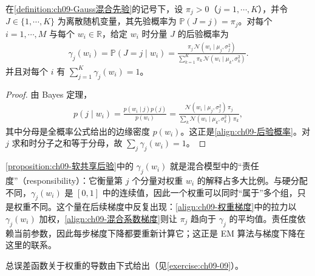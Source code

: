 \documentclass[../../main.tex]{subfiles}
\begin{document}
\begin{proposition}[软权重共享的后验概率]\label{proposition:ch09-软共享后验}
在\cref{definition:ch09-Gauss混合先验}的记号下，设 $\pi_{j}>0$（$j=1,\cdots,K$），并令 $J\in\{1,\cdots,K\}$ 为离散随机变量，其先验概率为 $\mathbb{P}(J=j)=\pi_{j}$。对每个 $i=1,\cdots,M$ 与每个 $w_{i}\in\mathbb{R}$，给定 $w_{i}$ 时分量 $J$ 的后验概率为
\begin{align}
\gamma_{j}(w_{i})=\mathbb{P}(J=j\mid w_{i})=\frac{\pi_{j}\,\mathcal{N}\!\left(w_{i}\mid\mu_{j},\sigma_{j}^{2}\right)}{\sum_{k=1}^{K}\pi_{k}\,\mathcal{N}\!\left(w_{i}\mid\mu_{k},\sigma_{k}^{2}\right)}.
\label{align:ch09-后验概率}
\end{align}
并且对每个 $i$ 有 $\sum_{j=1}^{K}\gamma_{j}(w_{i})=1$。
\end{proposition}

\begin{proof}
由 Bayes 定理，
\begin{align*}
p(j\mid w_{i})=\frac{p(w_{i}\mid j)p(j)}{p(w_{i})}=\frac{\mathcal{N}(w_{i}\mid\mu_{j},\sigma_{j}^{2})\,\pi_{j}}{\sum_{k}\mathcal{N}(w_{i}\mid\mu_{k},\sigma_{k}^{2})\,\pi_{k}},
\end{align*}
其中分母是全概率公式给出的边缘密度 $p(w_{i})$。这正是\eqref{align:ch09-后验概率}。对 $j$ 求和时分子之和等于分母，故 $\sum_{j}\gamma_{j}(w_{i})=1$。
\end{proof}

\begin{remark}\cref{proposition:ch09-软共享后验}中的 $\gamma_{j}(w_{i})$ 就是混合模型中的“责任度”（responsibility）：它衡量第 $j$ 个分量对权重 $w_{i}$ 的解释占多大比例。与硬分配不同，$\gamma_{j}(w_{i})$ 是 $[0,1]$ 中的连续值，因此一个权重可以同时“属于”多个组，只是权重不同。这个量在后续梯度中反复出现：\eqref{align:ch09-权重梯度}中的拉力以 $\gamma_{j}(w_{i})$ 加权，\eqref{align:ch09-混合系数梯度}则让 $\pi_{j}$ 趋向于 $\gamma_{j}$ 的平均值。责任度依赖当前参数，因此每步梯度下降都要重新计算它；这正是 EM 算法与梯度下降在这里的联系。
\end{remark}

总误差函数关于权重的导数由下式给出（见\cref{exercise:ch09-09}）。
\end{document}
